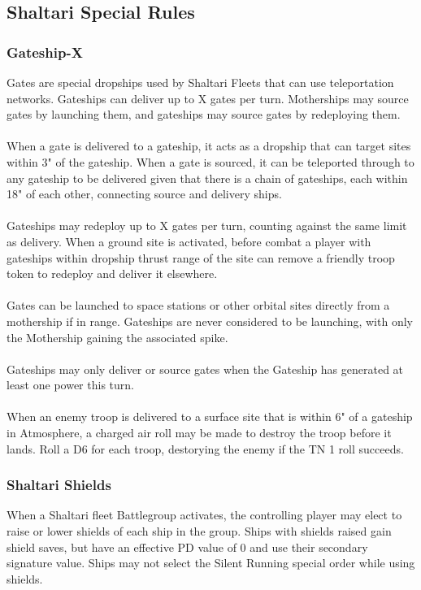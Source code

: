 \subsection{Shaltari Special Rules}

\subsubsection{Gateship-X}
Gates are special dropships used by Shaltari Fleets that can use teleportation networks. Gateships can deliver up to X gates per turn. Motherships may source gates by launching them, and gateships may source gates by redeploying them.
\\\\
When a gate is delivered to a gateship, it acts as a dropship that can target sites within 3" of the gateship. When a gate is sourced, it can be teleported through to any gateship to be delivered given that there is a chain of gateships, each within 18" of each other, connecting source and delivery ships.
\\\\
Gateships may redeploy up to X gates per turn, counting against the same limit as delivery. When a ground site is activated, before combat a player with gateships within dropship thrust range of the site can remove a friendly troop token to redeploy and deliver it elsewhere.\\\\
Gates can be launched to space stations or other orbital sites directly from a mothership if in range. Gateships are never considered to be launching, with only the Mothership gaining the associated spike.
\\\\
Gateships may only deliver or source gates when the Gateship has generated at least one power this turn.
\\\\
When an enemy troop is delivered to a surface site that is within 6" of a gateship in Atmosphere, a charged air roll may be made to destroy the troop before it lands. Roll a D6 for each troop, destorying the enemy if the TN 1 roll succeeds.

\subsubsection{Shaltari Shields}
When a Shaltari fleet Battlegroup activates, the controlling player may elect to raise or lower shields of each ship in the group. Ships with shields raised gain shield saves, but have an effective PD value of 0 and use their secondary signature value. Ships may not select the Silent Running special order while using shields.